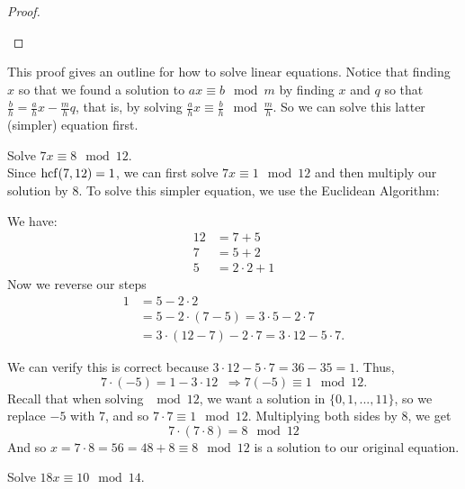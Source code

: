 \documentclass[11pt,dvipsnames]{book}
\def\hcf{{\rm hcf}}
\numberwithin{equation}{section} %
\numberwithin{figure}{section} %
\numberwithin{table}{section} %
\begin{document}
\begin{exercise}
\begin{proof}
\begin{itemize}
\end{itemize}



\end{proof}


This proof gives an outline for how to solve linear equations. Notice that finding $x$ so that we found a solution to $ax\equiv b\mod m$ by finding $x$ and $q$ so that $\frac{b}{h}=\frac{a}{h}x-\frac{m}{h}q$, that is, by solving $\frac{a}{h}x\equiv \frac{b}{h} \mod \frac{m}{h}$. So we can solve this latter (simpler) equation first.

\begin{example}
Solve $7x\equiv 8\mod 12$. \\

Since $\hcf(7,12)=1$, we can first solve $7x\equiv 1 \mod 12$ and then multiply our solution by $8$. To solve this simpler equation, we use the Euclidean Algorithm:
\begin{multicols}{2}
We have:
\begin{align*}
12 & =7+5 \\
7& =5+2 \\
5& =2\cdot 2 + 1 
\end{align*}
Now we reverse our steps
\begin{align*}
1&=5-2\cdot 2 \\
& = 5-2\cdot (7-5) = 3\cdot 5 -2\cdot 7\\
& = 3\cdot (12-7)-2\cdot 7 = 3\cdot 12-5\cdot 7.
\end{align*}



\end{multicols}

We can verify this is correct because $3\cdot 12 - 5 \cdot 7 = 36-35=1$. Thus,
\[
7\cdot (-5)=1-3\cdot 12 \;\; \Longrightarrow 7(-5) \equiv 1\mod 12.
\]
Recall that when solving $\mod 12$, we want a solution in $\{0,1,...,11\}$, so we replace $-5$ with $7$, and so $7\cdot 7 \equiv 1\mod 12$. Multiplying both sides by $8$, we get 
\[
7\cdot (7\cdot 8) = 8\mod 12\]
And so $x=7\cdot 8=56=48+8\equiv 8\mod 12$ is a solution to our original equation. 

\end{example}

%
%



\begin{example}
Solve $18x\equiv 10\mod 14$. \\


\end{example}
\end{exercise}
\end{document}
